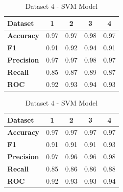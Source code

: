 \begin{table}[H]
\begin{subtable}[H]{0.45\textwidth}
\begin{tabular}{|l|c|c|c|c|}
      \hline
      \textbf{Dataset}   & \textbf{1} & \textbf{2} & \textbf{3} & \textbf{4} \\
      \hline
      \textbf{Accuracy}  & 0.97       & 0.97       & 0.98       & 0.97       \\
      \textbf{F1}        & 0.91       & 0.92       & 0.94       & 0.91       \\
      \textbf{Precision} & 0.97       & 0.97       & 0.98       & 0.97       \\
      \textbf{Recall}    & 0.85       & 0.87       & 0.89       & 0.87       \\
      \textbf{ROC}       & 0.92       & 0.93       & 0.94       & 0.93       \\
      \hline
    \end{tabular}
    \caption{Dataset 3 - SVM Model}\label{subtab:dataset_3_svm_model}
  \end{subtable}
  \quad
  \begin{subtable}[H]{0.45\textwidth}
    \centering
    \begin{tabular}{|l|c|c|c|c|}
      \hline
      \textbf{Dataset}   & \textbf{1} & \textbf{2} & \textbf{3} & \textbf{4} \\
      \hline
      \textbf{Accuracy}  & 0.97       & 0.97       & 0.97       & 0.97       \\
      \textbf{F1}        & 0.91       & 0.91       & 0.91       & 0.93       \\
      \textbf{Precision} & 0.97       & 0.96       & 0.96       & 0.98       \\
      \textbf{Recall}    & 0.85       & 0.86       & 0.86       & 0.88       \\
      \textbf{ROC}       & 0.92       & 0.93       & 0.93       & 0.94       \\
      \hline
    \end{tabular}
    \caption{Dataset 4 - SVM Model}\label{subtab:dataset_4_svm_model}
  \end{subtable}
\end{table}

